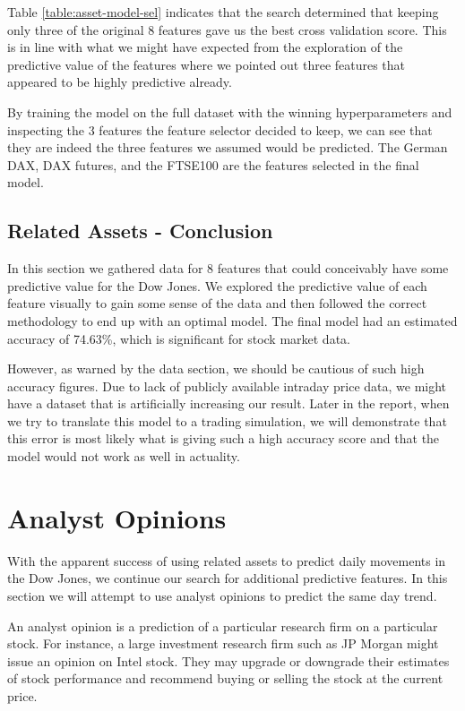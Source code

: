 \documentclass{report}
\begin{document}
Table \ref{table:asset-model-sel} indicates that the search determined that keeping only three of the original 8 features gave us the best cross validation score. This is in line with what we might have expected from the exploration of the predictive value of the features where we pointed out three features that appeared to be highly predictive already.

By training the model on the full dataset with the winning hyperparameters and inspecting the 3 features the feature selector decided to keep, we can see that they are indeed the three features we assumed would be predicted. The German DAX, DAX futures, and the FTSE100 are the features selected in the final model.

\subsection{Related Assets - Conclusion}

In this section we gathered data for 8 features that could conceivably have some predictive value for the Dow Jones. We explored the predictive value of each feature visually to gain some sense of the data and then followed the correct methodology to end up with an optimal model. The final model had an estimated accuracy of 74.63\%, which is significant for stock market data.

However, as warned by the data section, we should be cautious of such high accuracy figures. Due to lack of publicly available intraday price data, we might have a dataset that is artificially increasing our result. Later in the report, when we try to translate this model to a trading simulation,  we will demonstrate that this error is most likely what is giving such a high accuracy score and that the model would not work as well in actuality. 

\section{Analyst Opinions}

With the apparent success of using related assets to predict daily movements in the Dow Jones, we continue our search for additional predictive features. In this section we will attempt to use analyst opinions to predict the same day trend.

An analyst opinion is a prediction of a particular research firm on a particular stock. For instance, a large investment research firm such as JP Morgan might issue an opinion on Intel stock. They may upgrade or downgrade their estimates of stock performance and recommend buying or selling the stock at the current price.
\end{document}

